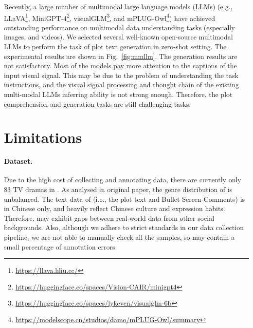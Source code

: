 Recently, a large number of multimodal large language models (LLMs) (e.g., LLaVA\footnote{\url{https://llava.hliu.cc/}}, MiniGPT-4\footnote{\url{https://huggingface.co/spaces/Vision-CAIR/minigpt4}}, visualGLM\footnote{\url{https://huggingface.co/spaces/lykeven/visualglm-6b}}, and mPLUG-Owl\footnote{\url{https://modelscope.cn/studios/damo/mPLUG-Owl/summary}}) have achieved outstanding performance on multimodal data understanding tasks (especially images, and videos).
We selected several well-known open-source multimodal LLMs to perform the task of plot text generation in zero-shot setting. The experimental results are shown in Fig.~\ref{fig:mmllm}.
The generation results are not satisfactory. Most of the models pay more attention to the captions of the input visual signal. This may be due to the problem of understanding the task instructions, and the visual signal processing and thought chain of the existing multi-modal LLMs inferring ability is not strong enough.
Therefore, the plot comprehension and generation tasks are still challenging tasks.



\section{Limitations}
\label{sec:limitations}
\paragraph{Dataset.}
Due to the high cost of collecting and annotating data, there are currently only 83 TV dramas in \TVD.
As analysed in original paper, the genre distribution of \TVD is unbalanced.
The text data of \TVD (i.e., the plot text and Bullet Screen Comments) is in Chinese only, and heavily reflect Chinese culture and expression habits. Therefore, \TVD may exhibit gaps between real-world data from other social backgrounds.
Also, although we adhere to strict standards in our data collection pipeline, we are not able to manually check all the samples, so \TVD may contain a small percentage of annotation errors.

